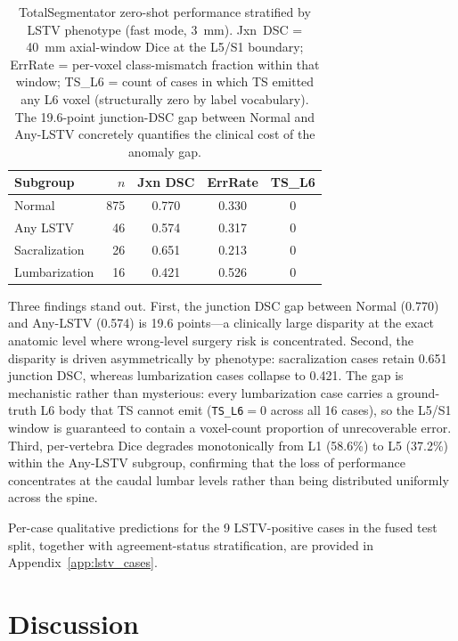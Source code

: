 \documentclass[pmlr]{jmlr}
\begin{document}
\begin{table}[t]
  {\caption{TotalSegmentator zero-shot performance stratified by
    LSTV phenotype (fast mode, 3~mm).
    Jxn~DSC = 40~mm axial-window Dice at the L5/S1 boundary;
    ErrRate = per-voxel class-mismatch fraction within that window;
    TS\_L6 = count of cases in which TS emitted any L6 voxel
    (structurally zero by label vocabulary).
    The 19.6-point junction-DSC gap between Normal and Any-LSTV
    concretely quantifies the clinical cost of the anomaly gap.}}
  {\small\begin{tabular}{lrccc}
  \toprule
  \bfseries Subgroup & \bfseries $n$
    & \bfseries Jxn DSC & \bfseries ErrRate & \bfseries TS\_L6 \\
  \midrule
  Normal              & 875 & 0.770 & 0.330 & 0 \\
  Any LSTV            &  46 & 0.574 & 0.317 & 0 \\
  \quad Sacralization &  26 & 0.651 & 0.213 & 0 \\
  \quad Lumbarization &  16 & 0.421 & 0.526 & 0 \\
  \bottomrule
  \end{tabular}}
\end{table}

Three findings stand out.
First, the junction DSC gap between Normal (0.770) and Any-LSTV
(0.574) is 19.6 points---a clinically large disparity at the
exact anatomic level where wrong-level surgery risk is
concentrated.
Second, the disparity is driven asymmetrically by phenotype:
sacralization cases retain 0.651 junction DSC, whereas
lumbarization cases collapse to 0.421.
The gap is mechanistic rather than mysterious: every
lumbarization case carries a ground-truth L6 body that TS cannot
emit (\texttt{TS\_L6}${=}0$ across all 16 cases), so the L5/S1
window is guaranteed to contain a voxel-count proportion of
unrecoverable error.
Third, per-vertebra Dice degrades monotonically from L1 (58.6\%)
to L5 (37.2\%) within the Any-LSTV subgroup, confirming that the
loss of performance concentrates at the caudal lumbar levels
rather than being distributed uniformly across the spine.

Per-case qualitative predictions for the 9 LSTV-positive cases in
the fused test split, together with agreement-status
stratification, are provided in Appendix~\ref{app:lstv_cases}.

\section{Discussion}
\label{sec:discussion}
\end{document}

